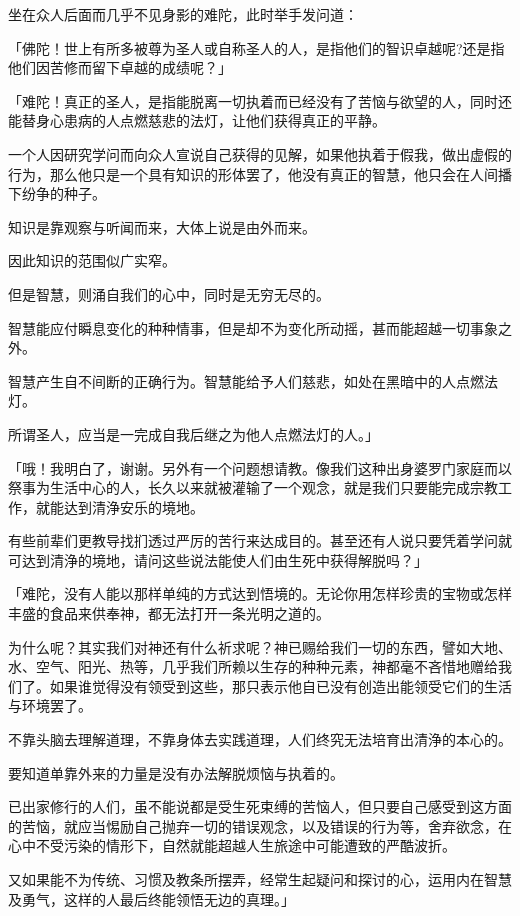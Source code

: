 \documentclass[twoside,openany]{book}
\begin{document}
坐在众人后面而几乎不见身影的难陀，此时举手发问道：

「佛陀！世上有所多被尊为圣人或自称圣人的人，是指他们的智识卓越呢?还是指他们因苦修而留下卓越的成绩呢？」

「难陀！真正的圣人，是指能脱离一切执着而已经没有了苦恼与欲望的人，同时还能替身心患病的人点燃慈悲的法灯，让他们获得真正的平静。

一个人因研究学问而向众人宣说自己获得的见解，如果他执着于假我，做出虚假的行为，那么他只是一个具有知识的形体罢了，他没有真正的智慧，他只会在人间播下纷争的种子。

知识是靠观察与听闻而来，大体上说是由外而来。

因此知识的范围似广实窄。

但是智慧，则涌自我们的心中，同时是无穷无尽的。

智慧能应付瞬息变化的种种情事，但是却不为变化所动摇，甚而能超越一切事象之外。

智慧产生自不间断的正确行为。智慧能给予人们慈悲，如处在黑暗中的人点燃法灯。

所谓圣人，应当是一完成自我后继之为他人点燃法灯的人。」

「哦！我明白了，谢谢。另外有一个问题想请教。像我们这种出身婆罗门家庭而以祭事为生活中心的人，长久以来就被灌输了一个观念，就是我们只要能完成宗教工作，就能达到清浄安乐的境地。

有些前辈们更教导找扪透过严厉的苦行来达成目的。甚至还有人说只要凭着学问就可达到清浄的境地，请问这些说法能使人们由生死中获得解脱吗？」

「难陀，没有人能以那样单纯的方式达到悟境的。无论你用怎样珍贵的宝物或怎样丰盛的食品来供奉神，都无法打开一条光明之道的。

为什么呢？其实我们对神还有什么祈求呢？神已赐给我们一切的东西，譬如大地、水、空气、阳光、热等，几乎我们所赖以生存的种种元素，神都毫不吝惜地赠给我们了。如果谁觉得没有领受到这些，那只表示他自已没有创造出能领受它们的生活与环境罢了。

不靠头脑去理解道理，不靠身体去实践道理，人们终究无法培育出清浄的本心的。

要知道单靠外来的力量是没有办法解脱烦恼与执着的。

已出家修行的人们，虽不能说都是受生死束缚的苦恼人，但只要自己感受到这方面的苦恼，就应当惕励自己抛弃一切的错误观念，以及错误的行为等，舍弃欲念，在心中不受污染的情形下，自然就能超越人生旅途中可能遭致的严酷波折。

又如果能不为传统、习惯及教条所摆弄，经常生起疑问和探讨的心，运用内在智慧及勇气，这样的人最后终能领悟无边的真理。」
\end{document}
